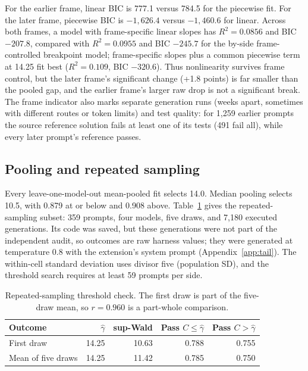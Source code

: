 \documentclass{article}
\begin{document}
For the earlier frame, linear BIC is 777.1 versus 784.5 for the piecewise fit. For the later frame, piecewise BIC is $-1{,}626.4$ versus $-1{,}460.6$ for linear. Across both frames, a model with frame-specific linear slopes has $R^2=0.0856$ and BIC $-207.8$, compared with $R^2=0.0955$ and BIC $-245.7$ for the by-side frame-controlled breakpoint model; frame-specific slopes plus a common piecewise term at 14.25 fit best ($R^2=0.109$, BIC $-320.6$). Thus nonlinearity survives frame control, but the later frame's significant change (+1.8 points) is far smaller than the pooled gap, and the earlier frame's larger raw drop is not a significant break. The frame indicator also marks separate generation runs (weeks apart, sometimes with different routes or token limits) and test quality: for 1{,}259 earlier prompts the source reference solution fails at least one of its tests (491 fail all), while every later prompt's reference passes.

\subsection{Pooling and repeated sampling}

Every leave-one-model-out mean-pooled fit selects 14.0. Median pooling selects 10.5, with 0.879 at or below and 0.908 above. Table~\ref{tab:passk} gives the repeated-sampling subset: 359 prompts, four models, five draws, and 7{,}180 executed generations. Its code was saved, but these generations were not part of the independent audit, so outcomes are raw harness values; they were generated at temperature 0.8 with the extension's system prompt (Appendix~\ref{app:tail}). The within-cell standard deviation uses divisor five (population SD), and the threshold search requires at least 59 prompts per side.

\begin{table}[h]
\centering
\caption{Repeated-sampling threshold check. The first draw is part of the five-draw mean, so $r=0.960$ is a part-whole comparison.}
\label{tab:passk}
\begin{tabular}{@{}lrrrr@{}}
\toprule
Outcome & $\hat{\gamma}$ & sup-Wald & Pass $C\leq\hat{\gamma}$ & Pass $C>\hat{\gamma}$ \\
\midrule
First draw & 14.25 & 10.63 & 0.788 & 0.755 \\
Mean of five draws & 14.25 & 11.42 & 0.785 & 0.750 \\
\bottomrule
\end{tabular}
\end{table}
\end{document}
